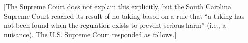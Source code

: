 
[The Supreme Court does not explain this explicitly, but the South Carolina
Supreme Court reached its result of no taking based on a rule that ``a taking
has not been found when the regulation exists to prevent serious harm'' (i.e., a
nuisance). The U.S. Supreme Court responded as follows.]

